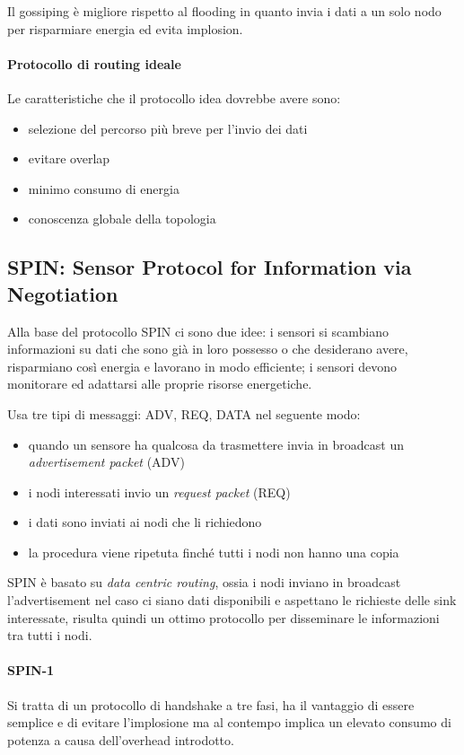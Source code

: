 	Il gossiping è migliore rispetto al flooding in quanto invia i dati a un solo nodo per risparmiare energia ed evita implosion.
	
\paragraph{Protocollo di routing ideale}
	Le caratteristiche che il protocollo idea dovrebbe avere sono:
	\begin{itemize}
		\item selezione del percorso più breve per l'invio dei dati
		\item evitare overlap
		\item minimo consumo di energia
		\item conoscenza globale della topologia
	\end{itemize}


\subsection{SPIN: Sensor Protocol for Information via Negotiation}

	Alla base del protocollo SPIN ci sono due idee: i sensori si scambiano informazioni su dati che sono già in loro possesso o che desiderano avere, risparmiano così energia e lavorano in modo efficiente; i sensori devono monitorare ed adattarsi alle proprie risorse energetiche.
	
	Usa tre tipi di messaggi: ADV, REQ, DATA nel seguente modo:
	\begin{itemize}
		\item quando un sensore ha qualcosa da trasmettere invia in broadcast un \emph{advertisement packet} (ADV)
		\item i nodi interessati invio un \emph{request packet} (REQ)
		\item i dati sono inviati ai nodi che li richiedono
		\item la procedura viene ripetuta finché tutti i nodi non hanno una copia
	\end{itemize}

	SPIN è basato su \emph{data centric routing}, ossia i nodi inviano in broadcast l'advertisement nel caso ci siano dati disponibili e aspettano le richieste delle sink interessate, risulta quindi un ottimo protocollo per disseminare le informazioni tra tutti i nodi.
	
\paragraph{SPIN-1}
	Si tratta di un protocollo di handshake a tre fasi, ha il vantaggio di essere semplice e di evitare l'implosione ma al contempo implica un elevato consumo di potenza a causa dell'overhead introdotto.
	
